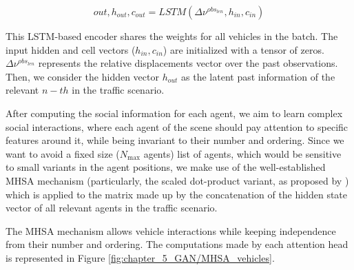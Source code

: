 \begin{equation}
	out, h_{out}, c_{out} = LSTM(\Delta \nu^{obs_{len}}, h_{in}, c_{in})
\end{equation}

This \ac{LSTM}-based encoder shares the weights for all vehicles in the batch. The input hidden and cell vectors ($h_{in}, c_{in}$) are initialized with a tensor of zeros. $\Delta \nu^{obs_{len}}$ represents the relative displacements vector over the past observations. Then, we consider the hidden vector $h_{out}$ as the latent past information of the relevant $n-th$ in the traffic scenario.

After computing the social information for each agent, we aim to learn complex social interactions, where each agent of the scene should pay attention to specific features around it, while being invariant to their number and ordering. Since we want to avoid a fixed size ($N_{\text{max}}$ agents) list of agents, which would be sensitive to small variants in the agent positions, we make use of the well-established \acf{MHSA} mechanism \cite{vaswani2017attention} (particularly, the scaled dot-product variant, as proposed by \cite{mercat2020multi}) which is applied to the matrix made up by the concatenation of the hidden state vector of all relevant agents in the traffic scenario.

The \ac{MHSA} mechanism allows vehicle interactions while keeping independence from their number
and ordering. The computations made by each attention head is represented in Figure \ref{fig:chapter_5_GAN/MHSA_vehicles}.

